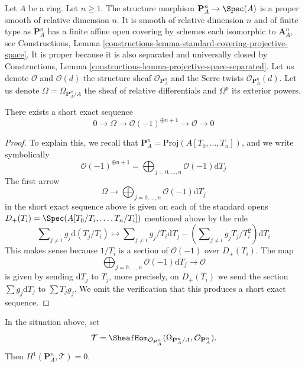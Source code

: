 \noindent
Let $A$ be a ring. Let $n \geq 1$. The structure morphism
$\mathbf{P}^n_A \to \Spec(A)$ is a proper smooth of relative
dimension $n$. It is smooth of relative dimension $n$ and of finite type
as $\mathbf{P}^n_A$ has a finite affine open covering by schemes each
isomorphic to $\mathbf{A}^n_A$, see Constructions, Lemma
\ref{constructions-lemma-standard-covering-projective-space}.
It is proper because it is also separated and universally closed
by Constructions, Lemma \ref{constructions-lemma-projective-space-separated}.
Let us denote $\mathcal{O}$ and $\mathcal{O}(d)$ the structure sheaf
$\mathcal{O}_{\mathbf{P}^n_A}$ and the Serre twists
$\mathcal{O}_{\mathbf{P}^n_A}(d)$.
Let us denote $\Omega = \Omega_{\mathbf{P}^n_A/A}$ the sheaf
of relative differentials and $\Omega^p$ its exterior powers.

\begin{lemma}
\label{lemma-euler-sequence}
There exists a short exact sequence
$$
0 \to \Omega \to \mathcal{O}(-1)^{\oplus n + 1} \to \mathcal{O} \to 0
$$
\end{lemma}

\begin{proof}
To explain this, we recall that
$\mathbf{P}^n_A = \text{Proj}(A[T_0, \ldots, T_n])$,
and we write symbolically
$$
\mathcal{O}(-1)^{\oplus n + 1} =
\bigoplus\nolimits_{j = 0, \ldots, n} \mathcal{O}(-1) \text{d}T_j
$$
The first arrow
$$
\Omega \to
\bigoplus\nolimits_{j = 0, \ldots, n} \mathcal{O}(-1) \text{d}T_j
$$
in the short exact sequence above
is given on each of the standard opens
$D_+(T_i) = \Spec(A[T_0/T_i, \ldots, T_n/T_i])$
mentioned above by the rule
$$
\sum\nolimits_{j \not = i} g_j \text{d}(T_j/T_i)
\longmapsto
\sum\nolimits_{j \not = i} g_j/T_i \text{d}T_j
- (\sum\nolimits_{j \not = i} g_jT_j/T_i^2) \text{d}T_i
$$
This makes sense because $1/T_i$ is a section of $\mathcal{O}(-1)$
over $D_+(T_i)$. The map
$$
\bigoplus\nolimits_{j = 0, \ldots, n} \mathcal{O}(-1) \text{d}T_j
\to
\mathcal{O}
$$
is given by sending $\text{d}T_j$ to $T_j$, more precisely, on
$D_+(T_i)$ we send the section $\sum g_j \text{d}T_j$ to
$\sum T_jg_j$. We omit the verification that this produces
a short exact sequence.
\end{proof}

\begin{lemma}
\label{lemma-H1-tangent-projective-space}
In the situation above, set
$$
\mathcal{T} =
\SheafHom_{\mathcal{O}_{\mathbf{P}^n_A}}
(\Omega_{\mathbf{P}^n_A/A}, \mathcal{O}_{\mathbf{P}^n_A}).
$$
Then $H^1(\mathbf{P}^n_A, \mathcal{T}) = 0$.
\end{lemma}

